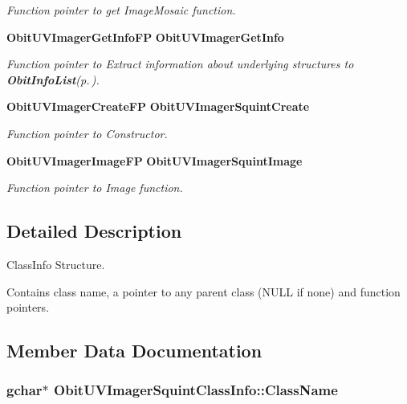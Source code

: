 \begin{CompactItemize}
\begin{CompactList}\small\item\em Function pointer to get Image\-Mosaic function. \item\end{CompactList}\item 
{\bf Obit\-UVImager\-Get\-Info\-FP} {\bf Obit\-UVImager\-Get\-Info}
\begin{CompactList}\small\item\em Function pointer to Extract information about underlying structures to {\bf Obit\-Info\-List}{\rm (p.\,\pageref{structObitInfoList})}. \item\end{CompactList}\item 
{\bf Obit\-UVImager\-Create\-FP} {\bf Obit\-UVImager\-Squint\-Create}
\begin{CompactList}\small\item\em Function pointer to Constructor. \item\end{CompactList}\item 
{\bf Obit\-UVImager\-Image\-FP} {\bf Obit\-UVImager\-Squint\-Image}
\begin{CompactList}\small\item\em Function pointer to Image function. \item\end{CompactList}\end{CompactItemize}


\subsection{Detailed Description}
Class\-Info Structure. 

Contains class name, a pointer to any parent class (NULL if none) and function pointers. 



\subsection{Member Data Documentation}
\subsubsection{\setlength{\rightskip}{0pt plus 5cm}gchar$\ast$ {\bf Obit\-UVImager\-Squint\-Class\-Info::Class\-Name}}\label{structObitUVImagerSquintClassInfo_o2}


